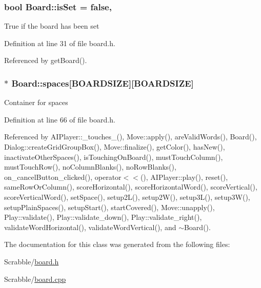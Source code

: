 \hypertarget{class_board_a6862f6207a47592cd5807f08e8d6564b}{
\subsubsection[{is\-Set}]{\setlength{\rightskip}{0pt plus 5cm}bool Board\-::is\-Set = false\hspace{0.3cm}{\ttfamily [static]}, {\ttfamily [private]}}}\label{class_board_a6862f6207a47592cd5807f08e8d6564b}
True if the board has been set 

Definition at line 31 of file board.\-h.



Referenced by get\-Board().

\hypertarget{class_board_a73b12248ddb6ee3adc24f4458d8661c2}{
\subsubsection[{spaces}]{$\ast$ Board\-::spaces\mbox{[}{\bf B\-O\-A\-R\-D\-S\-I\-Z\-E}\mbox{]}\mbox{[}{\bf B\-O\-A\-R\-D\-S\-I\-Z\-E}\mbox{]}}}\label{class_board_a73b12248ddb6ee3adc24f4458d8661c2}
Container for spaces 

Definition at line 66 of file board.\-h.



Referenced by A\-I\-Player\-::\-\_\-touches\-\_(), Move\-::apply(), are\-Valid\-Words(), Board(), Dialog\-::create\-Grid\-Group\-Box(), Move\-::finalize(), get\-Color(), has\-New(), inactivate\-Other\-Spaces(), is\-Touching\-On\-Board(), must\-Touch\-Column(), must\-Touch\-Row(), no\-Column\-Blanks(), no\-Row\-Blanks(), on\-\_\-cancel\-Button\-\_\-clicked(), operator$<$$<$(), A\-I\-Player\-::play(), reset(), same\-Row\-Or\-Column(), score\-Horizontal(), score\-Horizontal\-Word(), score\-Vertical(), score\-Vertical\-Word(), set\-Space(), setup2\-L(), setup2\-W(), setup3\-L(), setup3\-W(), setup\-Plain\-Spaces(), setup\-Start(), start\-Covered(), Move\-::unapply(), Play\-::validate(), Play\-::validate\-\_\-down(), Play\-::validate\-\_\-right(), validate\-Word\-Horizontal(), validate\-Word\-Vertical(), and $\sim$\-Board().



The documentation for this class was generated from the following files\-:\begin{DoxyCompactItemize}
\item 
Scrabble/\hyperlink{board_8h}{board.\-h}\item 
Scrabble/\hyperlink{board_8cpp}{board.\-cpp}\end{DoxyCompactItemize}
